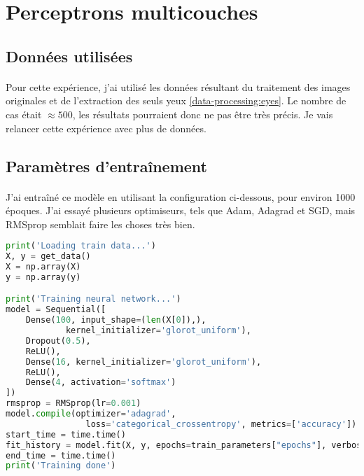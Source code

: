 \section{Perceptrons multicouches}
\subsection{Données utilisées}
\paragraph{}
Pour cette expérience, j'ai utilisé les données résultant du traitement des images originales et de l'extraction des seuls yeux \ref{data-processing:eyes}.
Le nombre de cas était $\approx500$, les résultats pourraient donc ne pas être très précis.
Je vais relancer cette expérience avec plus de données.

\subsection{Paramètres d'entraînement}
\paragraph{}
J'ai entraîné ce modèle en utilisant la configuration ci-dessous, pour environ 1000 époques.
J'ai essayé plusieurs optimiseurs, tels que Adam, Adagrad et SGD, mais RMSprop semblait faire les choses très bien.

\begin{lstlisting}[language=python, caption=Formation du MLP]
print('Loading train data...')
X, y = get_data()
X = np.array(X)
y = np.array(y)

print('Training neural network...')
model = Sequential([
    Dense(100, input_shape=(len(X[0]),),
            kernel_initializer='glorot_uniform'),
    Dropout(0.5),
    ReLU(),
    Dense(16, kernel_initializer='glorot_uniform'),
    ReLU(),
    Dense(4, activation='softmax')
])
rmsprop = RMSprop(lr=0.001)
model.compile(optimizer='adagrad',
                loss='categorical_crossentropy', metrics=['accuracy'])
start_time = time.time()
fit_history = model.fit(X, y, epochs=train_parameters["epochs"], verbose=1)
end_time = time.time()
print('Training done')
\end{lstlisting}

